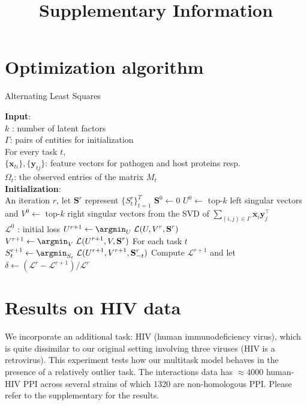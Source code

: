 \documentclass[a4paper,11pt]{article}
\begin{document}
\title{Supplementary Information}

\section{Optimization algorithm}

\begin{algorithm}[!t]   \caption{Alternating Least Squares}
   \label{alg}
   \begin{small}
\begin{algorithmic}[1]
\STATE \textbf{Input}: \\
$k$ : number of latent factors\\
$\Gamma$: pairs of entities for initialization\\
For every task $t$,\\
${\{\mathbf{x}_{ti}\}, \{\mathbf{y}_{tj}\}}$: feature vectors for pathogen and host proteins resp.\\
$\Omega_t$: the observed entries of the matrix $M_t$\\
\STATE \textbf{Initialization}: \\
\STATE An iteration $r$, let $\mathbf{S}^r$ represent $\{S^r_t\}_{t=1}^T$
\STATE $\mathbf{S}^0 \leftarrow 0$
\STATE $U^0 \leftarrow$ top-$k$ left singular vectors and $V^0 \leftarrow$ top-$k$ right singular vectors from the SVD of $\displaystyle{\sum_{(i,j) \in \Gamma}} \mathbf{x}_i \mathbf{y}_j^\intercal$\\
\STATE $\mathcal{L}^0$ : initial loss
\REPEAT
  \STATE $U^{r+1} \leftarrow \displaystyle{\argmin_{U}} \; \mathcal{L}(U, V^r, \mathbf{S}^r)$  \STATE $V^{r+1} \leftarrow \displaystyle{\argmin_{V}} \; \mathcal{L}(U^{r+1}, V, \mathbf{S}^r) $  \STATE For each task $t$\\
  \hspace{0.5cm} $S^{r+1}_t \leftarrow \displaystyle{\argmin_{S_t}} \; \mathcal{L}(U^{r+1}, V^{r+1}, \mathbf{S}^r_{-t}) $
  \STATE Compute $\mathcal{L}^{r+1}$ and let $\delta \leftarrow (\mathcal{L}^r - \mathcal{L}^{r+1})/\mathcal{L}^r$
\UNTIL {$\delta < \tau$}%
\end{algorithmic}\end{small}
\end{algorithm}


\section{Results on HIV data}
We incorporate an additional task: HIV (human immunodeficiency virus), which is quite dissimilar to our original setting involving three viruses (HIV is a retrovirus). This experiment tests how our multitask model behaves in the presence of a relatively outlier task. The interactions data has $\approx$4000 human-HIV PPI across several strains of which 1320 are non-homologous PPI. Please refer to the supplementary for the results.
\end{document}
